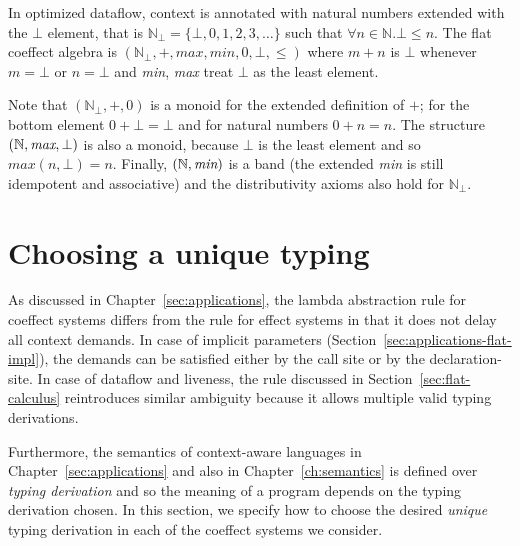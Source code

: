 \begin{example}
In optimized dataflow, context is annotated with natural numbers extended with the $\bot$ element,
that is $\mathbb{N}_{\bot} = \{\bot, 0, 1, 2, 3, \ldots \}$ such that $\forall n \in \mathbb{N}. \bot \leq n$.
The flat coeffect algebra is $(\mathbb{N}_{\bot}, +, \mathit{max}, \mathit{min}, 0, \bot, \leq)$
where $m + n$ is $\bot$ whenever $m=\bot$ or $n=\bot$ and \emph{min}, \emph{max} treat $\bot$ as the
least element.
\end{example}

\noindent
Note that $(\mathbb{N}_{\bot}, +, 0)$ is a monoid for the extended definition of $+$; for the
bottom element $0 + \bot = \bot$ and for natural numbers $0 + n = n$. The structure
$(\mathbb{N}, \emph{max}, \bot)$ is also a monoid, because $\bot$ is the least element and so
$\mathit{max}(n, \bot) = n$. Finally,  $(\mathbb{N}, \emph{min})$ is a band (the extended
\emph{min} is still idempotent and associative) and the distributivity axioms also hold
for $\mathbb{N}_{\bot}$.


%
%

\section{Choosing a unique typing}
\label{sec:flat-unique}

As discussed in Chapter~\ref{sec:applications}, the lambda abstraction rule for coeffect systems
differs from the rule for effect systems in that it does not delay all context demands.
In case of implicit parameters (Section~\ref{sec:applications-flat-impl}), the demands
can be satisfied either by the call site or by the declaration-site. In case of dataflow and
liveness, the rule discussed in Section~\ref{sec:flat-calculus} reintroduces similar ambiguity
because it allows multiple valid typing derivations.

Furthermore, the semantics of context-aware languages in Chapter~\ref{sec:applications} and
also in Chapter~\ref{ch:semantics} is defined over \emph{typing derivation} and so the meaning
of a program depends on the typing derivation chosen. In this section, we specify how to choose
the desired \emph{unique} typing derivation in each of the coeffect systems we consider.

